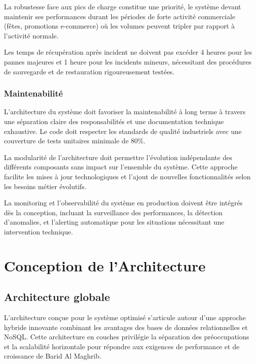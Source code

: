 La robustesse face aux pics de charge constitue une priorité, le système devant maintenir ses performances durant les périodes de forte activité commerciale (fêtes, promotions e-commerce) où les volumes peuvent tripler par rapport à l'activité normale.

Les temps de récupération après incident ne doivent pas excéder 4 heures pour les pannes majeures et 1 heure pour les incidents mineurs, nécessitant des procédures de sauvegarde et de restauration rigoureusement testées.

\subsubsection{Maintenabilité}

L'architecture du système doit favoriser la maintenabilité à long terme à travers une séparation claire des responsabilités et une documentation technique exhaustive. Le code doit respecter les standards de qualité industriels avec une couverture de tests unitaires minimale de 80\%.

La modularité de l'architecture doit permettre l'évolution indépendante des différents composants sans impact sur l'ensemble du système. Cette approche facilite les mises à jour technologiques et l'ajout de nouvelles fonctionnalités selon les besoins métier évolutifs.

La monitoring et l'observabilité du système en production doivent être intégrés dès la conception, incluant la surveillance des performances, la détection d'anomalies, et l'alerting automatique pour les situations nécessitant une intervention technique.
\newpage
\section{Conception de l'Architecture}

\subsection{Architecture globale}

L'architecture conçue pour le système optimisé s'articule autour d'une approche hybride innovante combinant les avantages des bases de données relationnelles et NoSQL. Cette architecture en couches privilégie la séparation des préoccupations et la scalabilité horizontale pour répondre aux exigences de performance et de croissance de Barid Al Maghrib.

